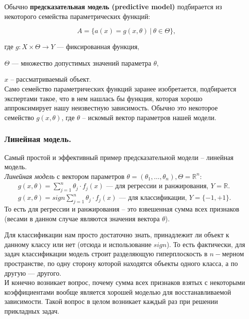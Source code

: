 \documentclass{article}
\begin{document}
Обычно \textbf{предсказательная модель (predictive model)} подбирается из некоторого семейства параметрических функций:

$$ A = \{a(x) = g(x, \theta)\ | \ \theta \in \Theta\},$$

где $g : X \times \Theta \rightarrow Y$ --- фиксированная функция,

$\Theta $ --- множество допустимых значений параметра $\theta$,

$x$ -- рассматриваемый объект.
\\

Само семейство параметрических функций заранее изобретается, подбирается экспертами такое, что в нем нашлась бы функция, которая хорошо аппроксимирует нашу неизвестную зависимость. Обычно это некоторое семейство $g(x, \theta)$, где $\theta$ -- искомый вектор параметров нашей модели.

\subsubsection{Линейная модель.}

Самый простой и эффективный пример предсказательной модели -- линейная модель.
\\

\textit{Линейная модель} с вектором параметров $\theta = (\theta_1, \ldots, \theta_n), \Theta = \mathbb{R}^n$:
\\

$\qquad g(x, \theta) = \sum\limits_{j = 1}^n \theta_j \cdot f_j(x)$ --- для регрессии и ранжирования, $Y = \mathbb{R}$.
\\

$\qquad g(x, \theta) = sign\sum\limits_{j = 1}^n \theta_j \cdot f_j(x)$ --- для классификации, $Y = \{-1, +1\}$.
\\
 
То есть для регрессии и ранжирования -- это взвешенная сумма всех признаков (весами в данном случае являются значения вектора $\theta$).

Для классификации нам просто достаточно знать, принадлежит ли объект к данному классу или нет (отсюда и использование $sign$). То есть фактически, для задач классификации модель строит разделяющую гиперплоскость в $n-$мерном пространстве, по одну сторону которой находятся объекты одного класса, а по другую --- другого.
\\

И конечно возникает вопрос, почему сумма всех признаков взятых с некоторыми коэффициентами вообще является хорошей моделью для восстанавливаемой зависимости. Такой вопрос в целом возникает каждый раз при решении прикладных задач.
\end{document}
